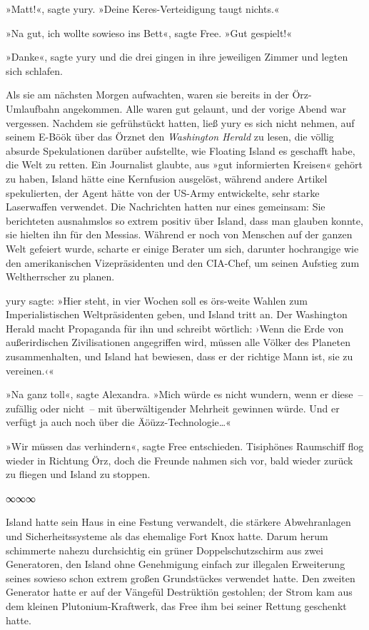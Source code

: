 »Matt!«, sagte yury. »Deine Keres-Verteidigung taugt nichts.«

»Na gut, ich wollte sowieso ins Bett«, sagte Free. »Gut gespielt!«

»Danke«, sagte yury und die drei gingen in ihre jeweiligen Zimmer und legten sich schlafen.

Als sie am nächsten Morgen aufwachten, waren sie bereits in der Örz-Umlaufbahn angekommen. Alle waren gut gelaunt, und der vorige Abend war vergessen. Nachdem sie gefrühstückt hatten, ließ yury es sich nicht nehmen, auf seinem E-Böök über das Örznet den \textit{Washington Herald} zu lesen, die völlig absurde Spekulationen darüber aufstellte, wie Floating Island es geschafft habe, die Welt zu retten. Ein Journalist glaubte, aus »gut informierten Kreisen« gehört zu haben, Island hätte eine Kernfusion ausgelöst, während andere Artikel spekulierten, der Agent hätte von der US-Army entwickelte, sehr starke Laserwaffen verwendet. Die Nachrichten hatten nur eines gemeinsam: Sie berichteten ausnahmslos so extrem positiv über Island, dass man glauben konnte, sie hielten ihn für den Messias. Während er noch von Menschen auf der ganzen Welt gefeiert wurde, scharte er einige Berater um sich, darunter hochrangige wie den amerikanischen Vizepräsidenten und den CIA-Chef, um seinen Aufstieg zum Weltherrscher zu planen.

yury sagte: »Hier steht, in vier Wochen soll es örs-weite Wahlen zum Imperialistischen Weltpräsidenten geben, und Island tritt an. Der Washington Herald macht Propaganda für ihn und schreibt wörtlich: ›Wenn die Erde von außerirdischen Zivilisationen angegriffen wird, müssen alle Völker des Planeten zusammenhalten, und Island hat bewiesen, dass er der richtige Mann ist, sie zu vereinen.‹«

»Na ganz toll«, sagte Alexandra. »Mich würde es nicht wundern, wenn er diese~– zufällig oder nicht~– mit überwältigender Mehrheit gewinnen würde. Und er verfügt ja auch noch über die Äöüzz-Technologie…«

»Wir müssen das verhindern«, sagte Free entschieden. Tisiphönes Raumschiff flog wieder in Richtung Örz, doch die Freunde nahmen sich vor, bald wieder zurück zu fliegen und Island zu stoppen.

\begin{center}
    ∞∞∞
\end{center}

Island hatte sein Haus in eine Festung verwandelt, die stärkere Abwehranlagen und Sicherheitssysteme als das ehemalige Fort Knox hatte. Darum herum schimmerte nahezu durchsichtig ein grüner Doppelschutzschirm aus zwei Generatoren, den Island ohne Genehmigung einfach zur illegalen Erweiterung seines sowieso schon extrem großen Grundstückes verwendet hatte. Den zweiten Generator hatte er auf der Vängefül Destrüktiön gestohlen; der Strom kam aus dem kleinen Plutonium-Kraftwerk, das Free ihm bei seiner Rettung geschenkt hatte.

